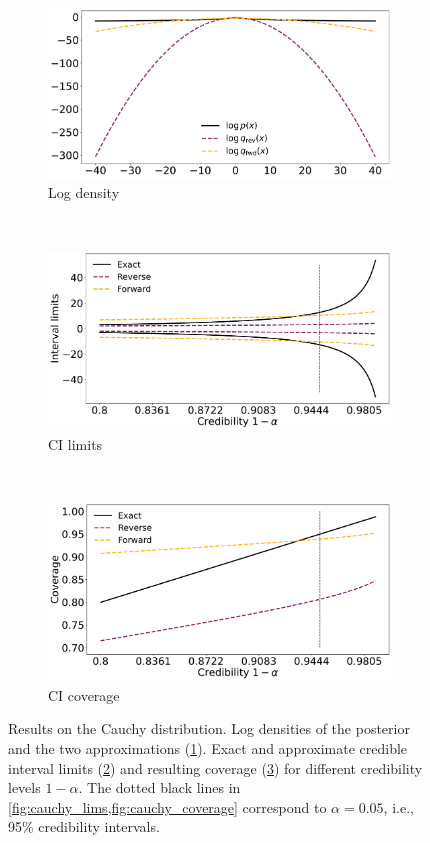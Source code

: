 \begin{figure}[ht]
    \begin{subfigure}{\linewidth}
    \centering
    \includegraphics[width=0.8\linewidth]{fig/cauchy_logq.pdf}
    \caption{Log density}
    \label{fig:cauchy_lp}
    \end{subfigure}\\[1ex]
    \begin{subfigure}{\linewidth}
    \centering
    \includegraphics[width=0.8\linewidth]{fig/cauchy_cilims.pdf}
    \caption{CI limits}
    \label{fig:cauchy_lims}
    \end{subfigure}\\[1ex]
    \begin{subfigure}{\linewidth}
    \centering
    \includegraphics[width=0.8\linewidth]{fig/cauchy_cicoverage.pdf}
    \caption{CI coverage}
    \label{fig:cauchy_coverage}
    \end{subfigure}
    \caption{Results on the Cauchy distribution.
    Log densities of the posterior and
    the two approximations (\cref{fig:cauchy_lp}).
    Exact and approximate credible interval limits (\cref{fig:cauchy_lims})
    and resulting coverage (\cref{fig:cauchy_coverage})
    for different credibility levels $1-\alpha$.
    The dotted black lines in \cref{fig:cauchy_lims,fig:cauchy_coverage}
    correspond to $\alpha=0.05$, i.e., 95\% credibility intervals.}
    \label{fig:cauchy}
\end{figure}



